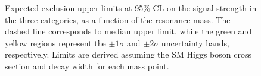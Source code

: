 \begin{figure}[!htb]
\centering
{}
\caption{Expected exclusion upper limits at 95\% CL on the signal strength in the three categories, as a function of the resonance mass. The dashed line corresponds to median upper limit, while the green and yellow regions represent the $\pm 1\sigma$ and $\pm 2 \sigma$ uncertainty bands, respectively. Limits are derived assuming the SM Higgs boson cross section and decay width for each mass point.}\label{fig:13TeVexplim}
\end{figure}

